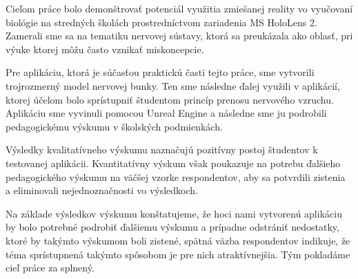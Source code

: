 Cieľom práce bolo demonštrovať potenciál využitia zmiešanej reality vo vyučovaní biológie na stredných školách prostredníctvom zariadenia MS HoloLens 2. Zamerali sme sa na tematiku nervovej sústavy, ktorá sa preukázala ako 
oblasť, pri výuke ktorej môžu často vznikať miskoncepcie.

Pre aplikáciu, ktorá je súčasťou praktickú časti tejto práce, sme vytvorili trojrozmerný model nervovej bunky. Ten sme následne ďalej využili v aplikácií, ktorej účelom bolo sprístupniť študentom princíp prenosu nervového
vzruchu. 
Aplikáciu sme vyvinuli pomocou Unreal Engine a následne sme ju podrobili pedagogickému výskumu v školských podmienkách. 

Výsledky kvalitatívneho výskumu naznačujú pozitívny postoj študentov k testovanej aplikácii.
Kvantitatívny výskum však poukazuje na potrebu ďalšieho pedagogického výskumu na väčšej vzorke respondentov, aby sa potvrdili zistenia a eliminovali nejednoznačnosti vo výsledkoch.

Na základe výsledkov výskumu konštatujeme, že hoci nami vytvorenú aplikáciu by bolo potrebné podrobiť ďalšiemu výskumu a prípadne odstrániť nedostatky, ktoré by takýmto výskumom boli zistené, 
spätná väzba respondentov indikuje, že téma sprístupnená takýmto spôsobom je pre nich atraktívnejšia. Tým pokladáme cieľ práce za splnený.


